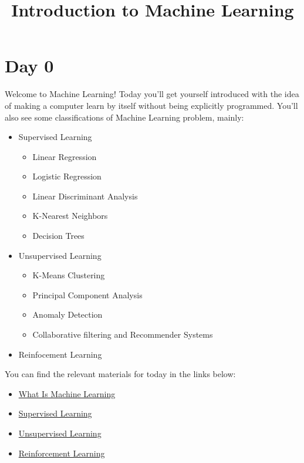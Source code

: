 \documentclass[11pt]{article}
\title{Introduction to Machine Learning}
\date{}
\begin{document}
\maketitle
\section{Day 0}
Welcome to Machine Learning! Today you'll get yourself introduced with the idea of making a computer learn by itself without being explicitly programmed. You'll also see some classifications of Machine Learning problem, mainly:
\begin{itemize}
\item Supervised Learning
\begin{itemize}
\item Linear Regression
\item Logistic Regression
\item Linear Discriminant Analysis
\item K-Nearest Neighbors
\item Decision Trees
\end{itemize}
\item Unsupervised Learning
\begin{itemize}
\item K-Means Clustering
\item Principal Component Analysis
\item Anomaly Detection
\item Collaborative filtering and Recommender Systems
\end{itemize}
\item Reinfocement Learning
\end{itemize}
You can find the relevant materials for today in the links below:
\begin{itemize}
\item \href{https://www.youtube.com/watch?v=PPLop4L2eGk}{What Is Machine Learning}
\item \href{https://www.youtube.com/watch?v=bQI5uDxrFfA}{Supervised Learning}
\item \href{https://www.youtube.com/watch?v=jAA2g9ItoAc}{Unsupervised Learning}
\item \href{https://www.youtube.com/watch?v=JgvyzIkgxF0}{Reinforcement Learning}
\end{itemize}
\end{document}
